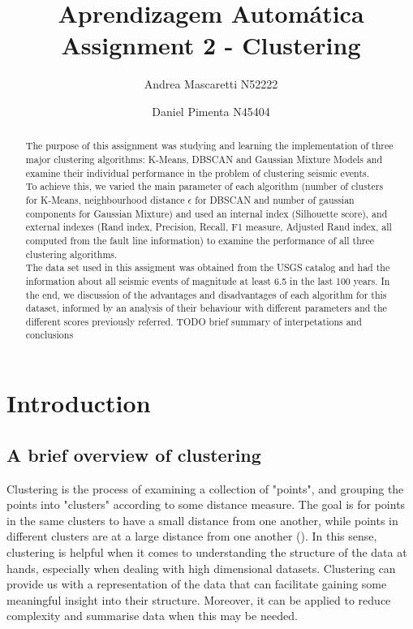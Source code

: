\documentclass[a4paper]{article}
\title{\textbf{Aprendizagem Autom\'{a}tica} \\
	\large Assignment 2 - Clustering}
\author{Andrea Mascaretti N52222\and Daniel Pimenta N45404}
\begin{document}
	\maketitle
	\begin{abstract}
	The purpose of this assignment was studying and learning the implementation of three major clustering algorithms: K-Means, DBSCAN and Gaussian Mixture Models and 
	examine their individual performance in the problem of clustering seismic events.\\
	To achieve this, we varied the main parameter of each algorithm (number of clusters for K-Means, neighbourhood distance $\epsilon$ for DBSCAN and number of gaussian components 
	for Gaussian Mixture) and used an internal index (Silhouette score), and external indexes (Rand index, Precision, Recall, F1 measure, Adjusted Rand index, all computed from the fault line information) 
	to examine the performance of all three clustering algorithms.\\
	The data set used in this assigment was obtained from the USGS catalog and had the information about all seismic events of magnitude at least 6.5 in the last 100 years.
	In the end, we discussion of the advantages and disadvantages of each algorithm for this dataset, informed by an analysis of their behaviour with different parameters 
	and the different scores previously referred.
	TODO brief summary of interpetations and conclusions
	\end{abstract}

	\section{Introduction}
	\subsection{A brief overview of clustering}
	Clustering is the process of examining a collection of "points", and grouping the points into "clusters" according to some distance measure. The goal is for points in the same clusters to have a small distance from one another, while points in different clusters are at a large distance from one another (\cite{9781107077232}).
	In this sense, clustering is helpful when it comes to understanding the structure of the data at hands, especially when dealing with high dimensional datasets. Clustering can provide us with a representation of the data that can facilitate gaining some meaningful insight into their structure. Moreover, it can be applied to reduce complexity and summarise data when this may be needed.\\
	
\end{document}
